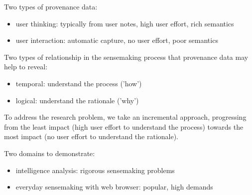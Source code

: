 %

Two types of provenance data:
\begin{itemize}
	\item user thinking: typically from user notes, high user effort, rich semantics 
	\item user interaction: automatic capture, no user effort, poor semantics
\end{itemize}

Two types of relationship in the sensemaking process that provenance data may help to reveal:
\begin{itemize}
	\item temporal: understand the process ('how')
	\item logical: understand the rationale ('why')
\end{itemize}

To address the research problem, we take an incremental approach, progressing from the least impact (high user effort to understand the process) towards the most impact (no user effort to understand the rationale).

Two domains to demonstrate:
\begin{itemize}
	\item intelligence analysis: rigorous sensemaking problems
	\item everyday sensemaking with web browser: popular, high demands
\end{itemize}
